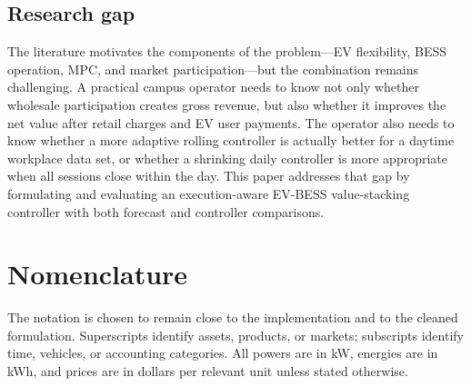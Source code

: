 \documentclass[final,5p,times]{elsarticle}
\begin{document}
\subsection{Research gap}
The literature motivates the components of the problem---EV flexibility, BESS operation, MPC, and market participation---but the combination remains challenging. A practical campus operator needs to know not only whether wholesale participation creates gross revenue, but also whether it improves the net value after retail charges and EV user payments. The operator also needs to know whether a more adaptive rolling controller is actually better for a daytime workplace data set, or whether a shrinking daily controller is more appropriate when all sessions close within the day. This paper addresses that gap by formulating and evaluating an execution-aware EV-BESS value-stacking controller with both forecast and controller comparisons.

\section{Nomenclature}
\label{sec:nomenclature}

The notation is chosen to remain close to the implementation and to the cleaned formulation. Superscripts identify assets, products, or markets; subscripts identify time, vehicles, or accounting categories. All powers are in kW, energies are in kWh, and prices are in dollars per relevant unit unless stated otherwise.
\end{document}

